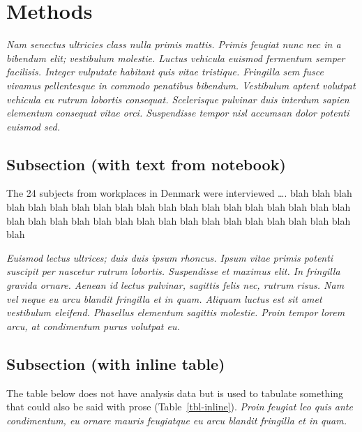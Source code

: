 \documentclass[
  10pt,
  a4paper,
]{scrbook}
\let\oldemph\emph
\renewcommand\emph[1]{\oldemph{\color{gray}#1}} %
\begin{document}
\chapter{Methods}\label{methods}

\emph{Nam senectus ultricies class nulla primis mattis. Primis feugiat
nunc nec in a bibendum elit; vestibulum molestie. Luctus vehicula
euismod fermentum semper facilisis. Integer vulputate habitant quis
vitae tristique. Fringilla sem fusce vivamus pellentesque in commodo
penatibus bibendum. Vestibulum aptent volutpat vehicula eu rutrum
lobortis consequat. Scelerisque pulvinar duis interdum sapien elementum
consequat vitae orci. Suspendisse tempor nisl accumsan dolor potenti
euismod sed.}

\section{Subsection (with text from
notebook)}\label{subsection-with-text-from-notebook}

\label{doc-sampling}
The 24 subjects from workplaces in Denmark were interviewed \ldots. blah
blah blah blah blah blah blah blah blah blah blah blah blah blah blah
blah blah blah blah blah blah blah blah blah blah blah blah blah blah
blah blah blah blah blah blah blah

\emph{Euismod lectus ultrices; duis duis ipsum rhoncus. Ipsum vitae
primis potenti suscipit per nascetur rutrum lobortis. Suspendisse et
maximus elit. In fringilla gravida ornare. Aenean id lectus pulvinar,
sagittis felis nec, rutrum risus. Nam vel neque eu arcu blandit
fringilla et in quam. Aliquam luctus est sit amet vestibulum eleifend.
Phasellus elementum sagittis molestie. Proin tempor lorem arcu, at
condimentum purus volutpat eu.}

\section{Subsection (with inline
table)}\label{subsection-with-inline-table}

The table below does not have analysis data but is used to tabulate
something that could also be said with prose (Table~\ref{tbl-inline}).
\emph{Proin feugiat leo quis ante condimentum, eu ornare mauris
feugiatque eu arcu blandit fringilla et in quam.}
\end{document}
